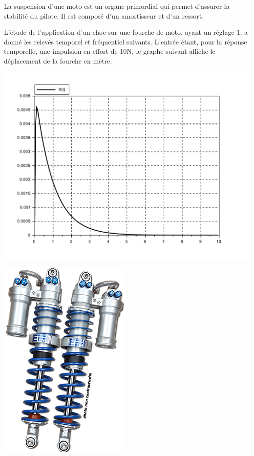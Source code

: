 \begin{minipage}{0.58\linewidth}
La suspension d'une moto est un organe primordial qui permet d'assurer la stabilité du pilote. Il est composé d'un amortisseur et d'un ressort.

L'étude de l'application d'un choc sur une fourche de moto, ayant un réglage 1, a donné les relevés temporel et fréquentiel suivants. L'entrée étant, pour la réponse temporelle, une impulsion en effort de 10N, le graphe suivant affiche le déplacement de la fourche en mètre.

\begin{center}
 \includegraphics[width=\linewidth]{img/02}
\end{center}

\end{minipage}\hfill
\begin{minipage}{0.38\linewidth}
\begin{center}
 \includegraphics[width=0.7\linewidth]{img/fig2}
\end{center}
\end{minipage}

